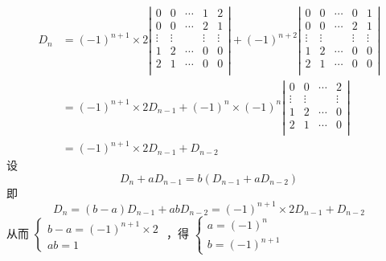 \documentclass[lang=cn,newtx,10pt,scheme=chinese]{elegantbook}
\begin{document}
\begin{solution}
	\begin{align*}
		D_n &= 
		(-1)^{n+1} \times 2
		\left|
		\begin{array}{ccccc}
			0       & 0       & \cdots & 1      & 2         \\
			0       & 0       & \cdots & 2      & 1         \\
			\vdots  & \vdots  &        & \vdots & \vdots	\\
			1       & 2       & \cdots & 0      & 0         \\
			2       & 1       & \cdots & 0      & 0         \\
		\end{array}
		\right|
		+ (-1)^{n+2}
		\left|
		\begin{array}{ccccc}
			0       & 0       & \cdots & 0      & 1         \\
			0       & 0       & \cdots & 2      & 1         \\
			\vdots  & \vdots  &        & \vdots & \vdots	\\
			1       & 2       & \cdots & 0      & 0         \\
			2       & 1       & \cdots & 0      & 0         \\
		\end{array}
		\right| \\
		&= (-1)^{n+1} \times 2D_{n-1} + (-1)^n \times (-1)^n
		\left|
		\begin{array}{cccc}
			0       & 0       & \cdots & 2 		\\
			\vdots  & \vdots  &        & \vdots	\\
			1       & 2       & \cdots & 0      \\
			2       & 1       & \cdots & 0      \\
		\end{array}
		\right| \\
		&= (-1)^{n+1} \times 2D_{n-1} + D_{n-2}
	\end{align*}
	设
	$$
	D_n + a D_{n-1} = b(D_{n-1} + a D_{n-2})
	$$
	即
	$$
	D_n = (b - a)D_{n-1} + ab D_{n-2} = (-1)^{n+1} \times 2D_{n-1} + D_{n-2}
	$$
	从而
	$
	\begin{cases}
		b - a = (-1)^{n+1} \times 2 \\
		ab = 1
	\end{cases}
	$
	，得
	$
	\begin{cases}
		a = (-1)^{n} \\
		b = (-1)^{n+1}
	\end{cases}
	$

\end{solution}
\end{document}
